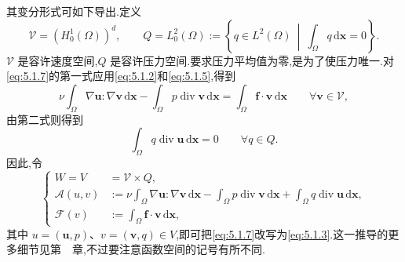 \begin{example}[(Stokes 问题)]
其变分形式可如下导出.定义
\begin{equation}\label{eq:5.1.8}
  \mathcal V=(H_0^1(\Omega))^d,\qquad
  Q=L_0^2(\Omega):=\left\{q\in L^2(\Omega)\ \middle|\ \int_\Omega q\,\mathrm d\boldsymbol{x}=0\right\}.
\end{equation}
\(\mathcal V\) 是容许速度空间,\(Q\) 是容许压力空间.要求压力平均值为零,是为了使压力唯一.对\eqref{eq:5.1.7}的第一式应用\eqref{eq:5.1.2}和\eqref{eq:5.1.5},得到
\[
  \nu\int_\Omega\nabla\boldsymbol{u}:\nabla\boldsymbol{v}\,\mathrm d\boldsymbol{x}
  -\int_\Omega p\operatorname{div}\boldsymbol{v}\,\mathrm d\boldsymbol{x}
  =\int_\Omega\boldsymbol{f}\cdot\boldsymbol{v}\,\mathrm d\boldsymbol{x}
  \qquad\forall\boldsymbol{v}\in\mathcal V,
\]
由第二式则得到
\[
  \int_\Omega q\operatorname{div}\boldsymbol{u}\,\mathrm d\boldsymbol{x}=0
  \qquad\forall q\in Q.
\]
因此,令
\begin{equation}\label{eq:5.1.9}
  \left\{
  \begin{aligned}
    W=V&=\mathcal V\times Q,\\
    \mathcal A(u,v)&:=\nu\int_\Omega\nabla\boldsymbol{u}:\nabla\boldsymbol{v}\,\mathrm d\boldsymbol{x}
     -\int_\Omega p\operatorname{div}\boldsymbol{v}\,\mathrm d\boldsymbol{x}
     +\int_\Omega q\operatorname{div}\boldsymbol{u}\,\mathrm d\boldsymbol{x},\\
    \mathcal F(v)&:=\int_\Omega\boldsymbol{f}\cdot\boldsymbol{v}\,\mathrm d\boldsymbol{x},
  \end{aligned}
  \right.
\end{equation}
其中 \(u=(\boldsymbol{u},p)\)、\(v=(\boldsymbol{v},q)\in V\),即可把\eqref{eq:5.1.7}改写为\eqref{eq:5.1.3}.这一推导的更多细节见第~~章,不过要注意函数空间的记号有所不同.
\end{example}

